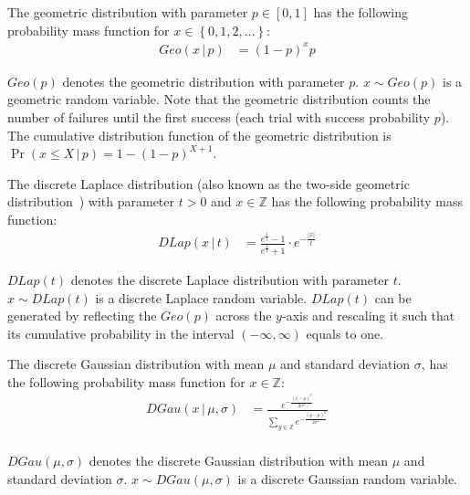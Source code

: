 \begin{definition}
    \label{def:GeometricDistribution}
    The geometric distribution with parameter $p \in \left[0,1\right] $ has the following probability mass function for $x\in \left\{0,1,2,\ldots\right\} $:
    \begin{equation}
        \begin{split}
            Geo \left( x \,|\, p \right) &=\left(1-p\right)^{x}p
        \end{split}
    \end{equation}
\end{definition}
$Geo \left(  p \right)$ denotes the geometric distribution with parameter $p$.
$x \sim Geo \left(  p \right)$ is a geometric random variable.
Note that the geometric distribution counts the number of failures until the first success (each trial with success probability $p$).
The cumulative distribution function of the geometric distribution is $\Pr\left(x\leq X \,|\,p\right) =1-\left(1-p\right)^{X+1} $.


\begin{definition}
    \label{def:DiscreteLaplaceDistribution}
    The discrete Laplace distribution (also known as the two-side geometric distribution~\cite{ghosh2012universally}) with parameter $t>0$ and $x \in \mathbb{Z}$ has the following probability mass function:
    \begin{equation}
        \begin{split}
            DLap \left(x \,|\,t\right)&= \frac{e^{\frac{1}{t}}-1}{e^{\frac{1}{t}}+1} \cdot e^{- \frac{\left\lvert x\right\rvert }{t} }
        \end{split}
    \end{equation}
\end{definition}
$DLap \left(t\right)$ denotes the discrete Laplace distribution with parameter $t$.
$x \sim DLap \left(  t \right)$ is a discrete Laplace random variable.
$DLap\left(t\right)$ can be generated by reflecting the $Geo\left(p\right) $ across the $y$-axis and rescaling it such that its cumulative probability in the interval $\left(-\infty ,\infty\right) $ equals to one.


\begin{definition}
    \label{def:DiscreteGaussianDistribution}
    The discrete Gaussian distribution with mean $\mu$ and standard deviation $\sigma$, has the following probability mass function for $x\in \mathbb{Z}$:
    \begin{equation}
        \begin{split}
            DGau \left(x \,|\,\mu,\sigma\right)&=\frac{e^{-\frac{\left(x-\mu\right)^2}{2 \sigma^2}} }{\sum_{y\in \mathbb{Z}} e^{-\frac{\left(y-\mu\right)^2}{2 \sigma^2}}}\\
        \end{split}
    \end{equation}
\end{definition}
$DGau \left(\mu,\sigma\right)$ denotes the discrete Gaussian distribution with mean $\mu$ and standard deviation $\sigma$.
$x \sim DGau \left(\mu,\sigma\right)$ is a discrete Gaussian random variable.


